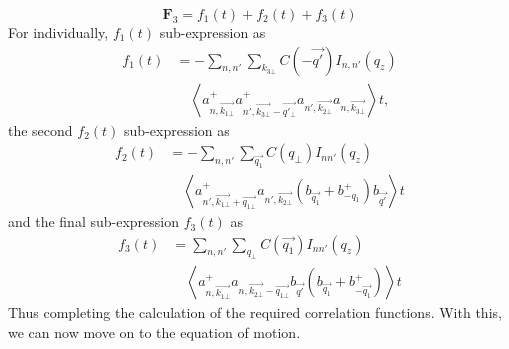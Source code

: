 \documentclass[%
 reprint,
 amsmath,amssymb,
 aps,
]{revtex4-2}
\begin{document}
\begin{equation}
    \mathbf{F}_{3} = f_{1}(t) + f_{2}(t) + f_{3}(t)
\end{equation}
For individually, $f_{1}(t)$ sub-expression as
\begin{equation}
    \begin{split}
        f_{1}(t) &= - \sum_{n,n'} \sum_{k_{3\bot}} C \left(- \vec{q'}\right) I _{n,n'} \left(q_z\right) \\
        & \quad \left \langle a^+_{n, \vec{k_{1\bot}}} a^+_{n', \vec{k_{3\bot}} - \vec{q'_{\bot}}}a_{n', \vec{k_{2\bot}}} a_{n, \vec{k_{3\bot}}}\right \rangle t,
    \end{split}
\end{equation}
the second $f_{2}(t)$ sub-expression as
\begin{equation}
    \begin{split}
        f_{2}(t)
        & = - \sum_{n,n'} \sum_{\vec{q_1}} C \left(q_\bot\right) I_{n n'} \left(q_z \right) \\
        & \quad \left \langle a^+_{n', \vec{k_{1\bot}} + \vec{q_{1\bot}}}a_{n', \vec{k_{2\bot}}}\left(b_{\vec{q_1}}+ b^+_{- q_1}\right) b_{\vec{q'}}\right \rangle t 
    \end{split}
\end{equation}
and the final sub-expression $f_{3}(t)$ as
\begin{equation}
    \begin{split}
        f_{3}(t)
        & = \sum_{n,n'} \sum_{q_\bot} C \left(\vec{q_1} \right) I_{nn'} \left(q_z\right) \\
        & \quad \left \langle a^+_{n, \vec{k_{1\bot}}} a_{n, \vec{k_{2\bot}} - \vec{q_{1\bot}}}b_{\vec{q'}} \left(b_{\vec{q_1}}+b^+_{- \vec{q_1}}\right) \right \rangle t
    \end{split}
\end{equation}
Thus completing the calculation of the required correlation functions. With this, we can now move on to the equation of motion. 
\end{document}
